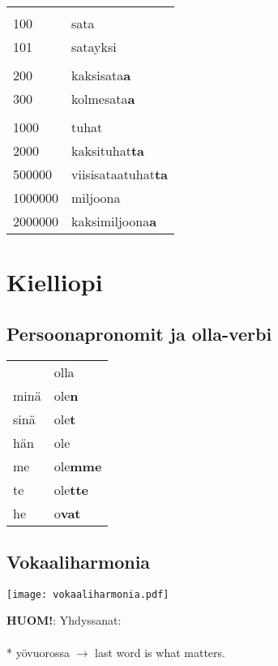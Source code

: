 \documentclass[../päätiedosto/pää.tex]{subfiles}
\begin{document}
\begin{tabularx}{\textwidth}{XX}
        &                    \\
100     & sata               \\
101     & satayksi           \\
        &                    \\
200     & kaksisata\textbf{a}         \\
300     & kolmesata\textbf{a}         \\
        &                    \\
1000    & tuhat              \\
2000    & kaksituhat\textbf{ta}       \\
500000  & viisisataatuhat\textbf{ta}  \\
1000000 & miljoona           \\
2000000 & kaksimiljoona\textbf{a}    
\end{tabularx}


\section{Kielliopi}

\subsection{Persoonapronomit ja olla-verbi}

\begin{tabularx}{\textwidth}{XX}
     & olla   \\
minä & ole\textbf{n}   \\
sinä & ole\textbf{t}   \\
hän  & ole    \\
me   & ole\textbf{mme} \\
te   & ole\textbf{tte} \\
he   & o\textbf{vat}  
\end{tabularx}

\subsection{Vokaaliharmonia}
\begin{center}
\texttt{[image: vokaaliharmonia.pdf]}
\end{center}
\vspace{2mm}
\textbf{HUOM!}: Yhdyssanat:\\ \\*
yö\textbar vuorossa $\rightarrow$ last word is what matters.
\end{document}
